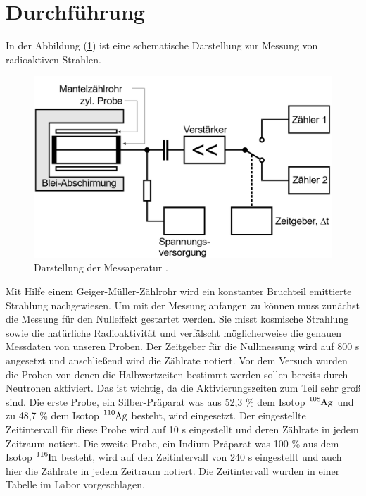 \section{Durchführung}
In der Abbildung (\ref{abb:2}) ist eine schematische Darstellung zur Messung von radioaktiven
Strahlen.
\begin{figure}[H]
  \centering
  \includegraphics[width=\textwidth]{content/Aufbau.png}
  \caption{Darstellung der Messaperatur \cite{1}.}
  \label{abb:2}
\end{figure}
Mit Hilfe einem Geiger-Müller-Zählrohr wird ein konstanter Bruchteil emittierte Strahlung nachgewiesen.
Um mit der Messung anfangen zu können muss zunächst die Messung für den Nulleffekt gestartet werden.
Sie misst kosmische Strahlung sowie die natürliche Radioaktivität und verfälscht möglicherweise die genauen
Messdaten von unseren Proben.
Der Zeitgeber für die Nullmessung wird auf 800 s angesetzt und anschließend wird die Zählrate notiert.
Vor dem Versuch wurden die Proben von denen die Halbwertzeiten bestimmt werden sollen
bereits durch Neutronen aktiviert. Das ist wichtig, da die Aktivierungszeiten zum Teil
sehr groß sind.
Die erste Probe, ein Silber-Präparat was aus 52,3 \% dem Isotop $\ce{^{108}_{}Ag}$ und zu 48,7 \% dem Isotop $\ce{^{110}_{}Ag}$ besteht, wird eingesetzt.
Der eingestellte Zeitintervall für diese Probe wird
auf 10 s eingestellt und deren Zählrate in jedem Zeitraum notiert.  Die zweite Probe, ein Indium-Präparat was 100 \% aus dem Isotop $\ce{^{116}_{}In}$ besteht,
wird auf den Zeitintervall von 240 s eingestellt und auch hier die Zählrate in jedem Zeitraum notiert.
Die Zeitintervall wurden in einer Tabelle im Labor vorgeschlagen.
